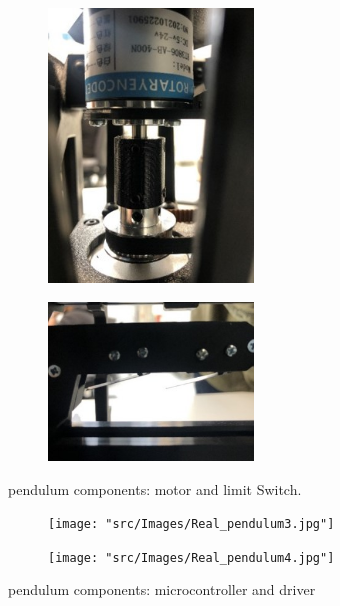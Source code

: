 \begin{figure}[h!]
	\begin{subfigure}{0.5\textwidth}
		\centering
		\includegraphics[width=0.6\textwidth]{"src/Images/Motor.jpg"}
		\label{fig:Motor}
	\end{subfigure}
	\hfill
	\begin{subfigure}{0.7\textwidth}
		\centering
		\includegraphics[width=0.6\textwidth]{"src/Images/Limit_Switch.jpg"}
		\label{fig:Limit Switch}
	\end{subfigure}
	\caption{pendulum components: motor and limit Switch.}
	\label{fig:Components of the Pendulum : Motor and Limit Switch}
\end{figure}


\begin{figure}[h!]
	
	\begin{subfigure}{0.45\textwidth}	
		\texttt{[image: "src/Images/Real\_pendulum3.jpg"]}
		\label{fig:ESP32 Microcontroller}
	\end{subfigure}
	\hfill
	\begin{subfigure}{0.45\textwidth}
		\centering
		\texttt{[image: "src/Images/Real\_pendulum4.jpg"]}
		\label{fig:Motor Driver}
	\end{subfigure}
	\caption{pendulum components: microcontroller and driver}
	\label{fig:Components of the Pendulum: Driver and ESP}
\end{figure}  

